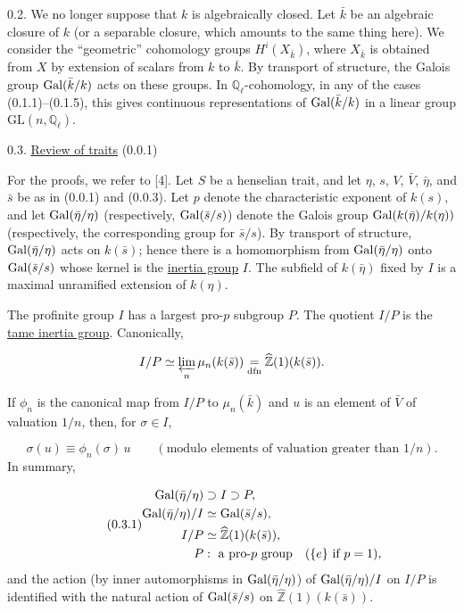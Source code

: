 0.2. We no longer suppose that $k$ is algebraically closed. Let $\bar{k}$ be an algebraic closure of $k$ (or a separable closure, which amounts to the same thing here). We consider the ``geometric'' cohomology groups $H^i(X_{\bar{k}})$, where $X_{\bar{k}}$ is obtained from $X$ by extension of scalars from $k$ to $\bar{k}$. By transport of structure, the Galois group $\operatorname{Gal}(\bar{k}/k)$ acts on these groups. In $\mathbb{Q}_\ell$-cohomology, in any of the cases (0.1.1)--(0.1.5), this gives continuous representations of $\operatorname{Gal}(\bar{k}/k)$ in a linear group $\mathrm{GL}(n,\mathbb{Q}_\ell)$.

0.3. \underline{Review of traits} (0.0.1)

For the proofs, we refer to [4]. Let $S$ be a henselian trait, and let $\eta$, $s$, $V$, $\bar V$, $\bar\eta$, and $\bar s$ be as in (0.0.1) and (0.0.3). Let $p$ denote the characteristic exponent of $k(s)$, and let $\operatorname{Gal}(\bar\eta/\eta)$ (respectively, $\operatorname{Gal}(\bar s/s)$) denote the Galois group $\operatorname{Gal}(k(\bar\eta)/k(\eta))$ (respectively, the corresponding group for $\bar s/s$). By transport of structure, $\operatorname{Gal}(\bar\eta/\eta)$ acts on $k(\bar s)$; hence there is a homomorphism from $\operatorname{Gal}(\bar\eta/\eta)$ onto $\operatorname{Gal}(\bar s/s)$ whose kernel is the \underline{inertia group} $I$. The subfield of $k(\bar\eta)$ fixed by $I$ is a maximal unramified extension of $k(\eta)$.

The profinite group $I$ has a largest pro-$p$ subgroup $P$. The quotient $I/P$ is the \underline{tame inertia group}. Canonically,

\begin{equation*}
I/P\simeq \varprojlim_n\mu_n(k(\bar s))
\underset{\mathrm{dfn}}{=}\widehat{\mathbb{Z}}(1)(k(\bar s)).
\end{equation*}


If $\phi_n$ is the canonical map from $I/P$ to $\mu_n(\bar k)$ and $u$ is an element of $\bar V$ of valuation $1/n$, then, for $\sigma\in I$,

\begin{equation*}
\sigma(u)\equiv\phi_n(\sigma)\,u
\qquad (\text{modulo elements of valuation greater than }1/n).
\end{equation*}
In summary,

\begin{equation}\tag{0.3.1}
\begin{aligned}
\operatorname{Gal}(\bar\eta/\eta)&\supset I\supset P,\\
\operatorname{Gal}(\bar\eta/\eta)/I&\simeq\operatorname{Gal}(\bar s/s),\\
I/P&\simeq\widehat{\mathbb{Z}}(1)(k(\bar s)),\\
P&:\ \text{a pro-$p$ group}\quad(\{e\}\text{ if }p=1),
\end{aligned}
\end{equation}
and the action (by inner automorphisms in $\operatorname{Gal}(\bar\eta/\eta)$) of $\operatorname{Gal}(\bar\eta/\eta)/I$ on $I/P$ is identified with the natural action of $\operatorname{Gal}(\bar s/s)$ on $\widehat{\mathbb{Z}}(1)(k(\bar s))$.

